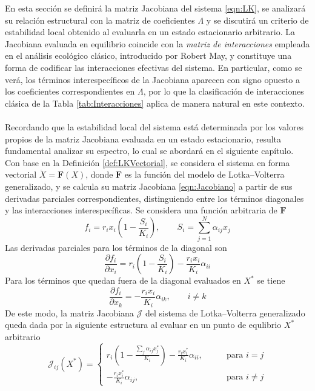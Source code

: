 En esta sección se definirá la matriz Jacobiana del sistema \eqref{eqn:LK}, se analizará su relación estructural con la matriz de coeficientes $\Lambda$ y se discutirá un criterio de estabilidad local obtenido al evaluarla en un estado estacionario arbitrario. La Jacobiana evaluada en equilibrio coincide con la \textit{matriz de interacciones} empleada en el análisis ecológico clásico, introducido por Robert May, y constituye una forma de codificar las interacciones efectivas del sistema. En particular, como se verá, los términos interespecíficos de la Jacobiana aparecen con signo opuesto a los coeficientes correspondientes en $\Lambda$, por lo que la clasificación de interacciones clásica de la Tabla \eqref{tab:Interacciones} aplica de manera natural en este contexto.
\\
\\
Recordando que la estabilidad local del sistema está determinada por los valores propios de la matriz Jacobiana evaluada en un estado estacionario, resulta fundamental analizar su espectro, lo cual se abordará en el siguiente capítulo. Con base en la Definición \ref{def:LKVectorial}, se considera el sistema en forma vectorial $\dot{X}=\textbf{F}(X)$, donde $\textbf{F}$ es la función del modelo de Lotka--Volterra generalizado, y se calcula su matriz Jacobiana \eqref{eqn:Jacobiano} a partir de sus derivadas parciales correspondientes, distinguiendo entre los términos diagonales y las interacciones interespecíficas. Se considera una función arbitraria de $\textbf{F}$
$$
f_i = r_ix_i\left (1 - \frac{S_i}{K_i}\right ),\qquad S_i=\sum_{j=1}^N \alpha_{ij}x_j
$$
Las derivadas parciales para los términos de la diagonal son
$$\frac{\partial f_i}{\partial x_i} = r_i\left (1-\frac{S_i}{K_i}\right )-\frac{r_ix_i}{K_i}\alpha_{ii}$$
Para los términos que quedan fuera de la diagonal evaluados en $X^*$ se tiene
$$\frac{\partial f_i}{\partial x_k} = -\frac{r_ix_i}{K_i}\alpha_{ik},\qquad i\neq k$$
De este modo, la matriz Jacobiana $\mathcal{J}$ del sistema de Lotka--Volterra generalizado queda dada por la siguiente estructura al evaluar en un punto de equlibrio $X^*$ arbitrario
\begin{equation}\label{eqn:MatrizJacobiana} 
	\mathcal{J}_{ij}(X^*)=\begin{cases} r_i\left (1-\frac{\sum_j\alpha_{ij}x_j^*}{K_i}\right )-\frac{r_ix_i^*}{K_i}\alpha_{ii},\qquad&\text{para }i=j\\ -\frac{r_ix_i^*}{K_i}\alpha_{ij},\qquad&\text{para }i\neq j 
	\end{cases}
\end{equation}
